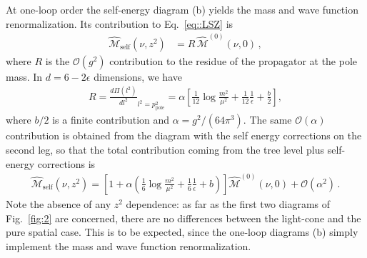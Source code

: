 At one-loop order the self-energy diagram (b) yields the mass and wave function
renormalization. Its contribution to Eq.~\eqref{eq::LSZ} is  
\begin{align}
        \widehat{\mathcal{M}}_{\text{self}}\left(\nu,z^2\right) 
        &=  R\, \widehat{\mathcal{M}}^{(0)}\left(\nu, 0\right)\, ,
\end{align}
where $R$ is the $\mathcal{O}\left(g^2\right)$ contribution to the residue of the propagator at the pole mass. In $d = 6 -2\epsilon$ dimensions, we have
\begin{align}
        R = {\frac{d\Pi\left(l^2\right)}{dl^2}}_{l^2=p^2_{\text{pole}}} 
        = \alpha\left[\frac{1}{12}\log\frac{m^2}{\mu^2} + \frac{1}{12}\frac{1}{\epsilon} + \frac{b}{2}\right],
\end{align}
where $b/2$ is a finite contribution and $\alpha=g^2 /(64\pi^3) $. The same
$\mathcal{O}\left(\alpha\right)$ contribution is obtained from the diagram with
the self energy corrections on the second leg, so that the total contribution
coming from the tree level plus self-energy corrections is 
\begin{align}\label{eq::zmzphi}
        \widehat{\mathcal{M}}_{\text{self}}\left(\nu,z^2\right)=\left[1+ \alpha\left(\frac{1}{6}\log\frac{m^2}{\mu^2} 
        + \frac{1}{6}\frac{1}{\epsilon} + b\right) \right]\widehat{\mathcal{M}}^{(0)}\left(\nu, 0\right)
        + \mathcal{O}\left(\alpha^2\right)\, .
\end{align}
Note the absence of any $z^2$ dependence: as far as the first two diagrams of
Fig.~\ref{fig:2} are concerned, there are no differences between the light-cone
and the pure spatial case. This is to be expected, since the one-loop diagrams
(b) simply implement the mass and wave function renormalization.

